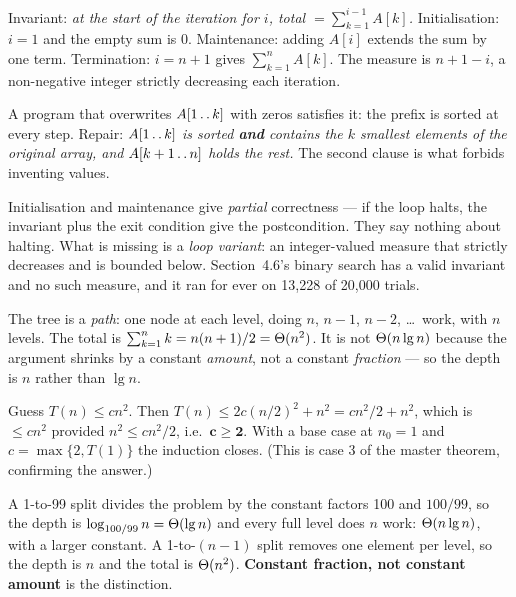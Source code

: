 \begin{ans}
  \item Invariant: \emph{at the start of the iteration for $i$,
        \textit{total} $= \sum_{k=1}^{i-1} A[k]$.} Initialisation:
        $i = 1$ and the empty sum is 0. Maintenance: adding $A[i]$ extends the
        sum by one term. Termination: $i = n+1$ gives
        $\sum_{k=1}^{n}A[k]$. The measure is $n + 1 - i$, a non-negative
        integer strictly decreasing each iteration.
  \item A program that overwrites $A[1 \mathinner{\ldotp\ldotp} k]$ with
        zeros satisfies it: the prefix is sorted at every step. Repair:
        \emph{$A[1\mathinner{\ldotp\ldotp}k]$ is sorted \textbf{and} contains
        the $k$ smallest elements of the original array, and
        $A[k+1\mathinner{\ldotp\ldotp}n]$ holds the rest.} The second clause is
        what forbids inventing values.
  \item Initialisation and maintenance give \emph{partial} correctness --- if
        the loop halts, the invariant plus the exit condition give the
        postcondition. They say nothing about halting. What is missing is a
        \emph{loop variant}: an integer-valued measure that strictly decreases
        and is bounded below. Section~4.6's binary search has a valid invariant
        and no such measure, and it ran for ever on 13{,}228 of 20{,}000 trials.
\end{ans}

\begin{ans}
  \item The tree is a \emph{path}: one node at each level, doing $n$, $n-1$,
        $n-2$, \ldots\ work, with $n$ levels. The total is
        $\sum_{k=1}^{n} k = n(n+1)/2 = \Theta(n^{2})$. It is not
        $\Theta(n\operatorname{lg} n)$ because the argument shrinks by a constant
        \emph{amount}, not a constant \emph{fraction} --- so the depth is $n$
        rather than $\lg n$.
  \item Guess $T(n) \le cn^{2}$. Then
        $T(n) \le 2c(n/2)^{2} + n^{2} = cn^{2}/2 + n^{2}$, which is
        $\le cn^{2}$ provided $n^{2} \le cn^{2}/2$, i.e.\ $\mathbf{c \ge 2}$.
        With a base case at $n_{0} = 1$ and $c = \max\{2, T(1)\}$ the induction
        closes. (This is case 3 of the master theorem, confirming the answer.)
  \item A 1-to-99 split divides the problem by the constant factors 100 and
        $100/99$, so the depth is $\log_{100/99} n = \Theta(\operatorname{lg} n)$ and every
        full level does $n$ work: $\Theta(n\operatorname{lg} n)$, with a larger constant. A
        1-to-$(n-1)$ split removes one element per level, so the depth is $n$
        and the total is $\Theta(n^{2})$. \textbf{Constant fraction, not
        constant amount} is the distinction.
\end{ans}

